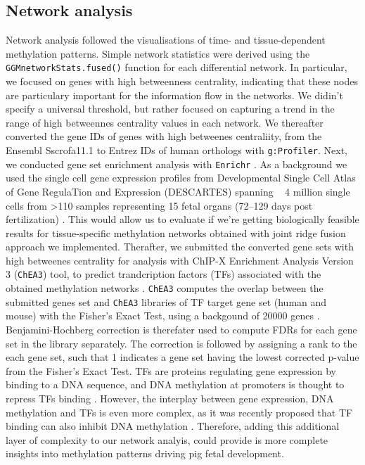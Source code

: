 \documentclass[
	a4paper, %
	10pt, %
	unnumberedsections, %
	twoside, %
]{LTJournalArticle}
\begin{document}
\subsection{\normalsize Network analysis}
Network analysis followed the visualisations of time- and tissue-dependent  
methylation patterns. Simple 
network statistics were derived using the \texttt{GGMnetworkStats.fused()} function 
for each differential network. In particular, we focused on genes with high betweenness centrality, indicating that these nodes
are particulary important for the information flow in the networks. We didin't specify a universal threshold,
but rather focused on capturing a trend in the range of high betweennes centrality values in each network.
We thereafter converted the gene IDs of genes with high betweenes centraliity, from the Ensembl Sscrofa11.1 
to Entrez IDs of human orthologs with \texttt{g:Profiler}.  
Next, we conducted gene set enrichment analysis with \texttt{Enrichr} \autocite{chen2013a, kuleshov2016a, xie2021a}.
As a background we used the single cell gene expression profiles from  Developmental Single Cell Atlas 
of Gene RegulaTion and Expression
(DESCARTES) spanning ~ 4 million single cells from >110 samples representing 15 fetal organs 
(72–129 days post fertilization) \autocite{cao2020a}.
This would allow us to evaluate if we're getting biologically feasible results for tissue-specific methylation networks
obtained with joint ridge fusion approach we implemented.
Therafter, we submitted the converted gene sets with high betweenes 
centrality for analysis with ChIP-X Enrichment Analysis Version 3 (\texttt{ChEA3}) tool, 
to predict trandcription factors (TFs)
associated with the obtained methylation networks \autocite{keenan2019a}. 
\texttt{ChEA3} computes the overlap between the submitted genes set and
\texttt{ChEA3} libraries of TF target gene set (human and mouse) with the Fisher's Exact 
Test, using a backgound of 20000 genes \autocite{keenan2019a}. Benjamini-Hochberg correction
is therefater used to compute FDRs for each gene set in the library separately. The correction is followed by assigning a rank to the
each gene set, such that 1 indicates a gene set having the lowest corrected p-value from the 
Fisher's Exact Test. TFs are proteins regulating
gene expression by binding to a DNA sequence, and DNA methylation at promoters is 
thought to repress TFs binding \autocite{wang2015a, mendoza2022a}. However, the interplay between gene expression, DNA methylation and
TFs is even more complex, as it was recently proposed that TF binding can also inhibit DNA methylation \autocite{h2019a}.
Therefore, adding this additional layer of complexity to our network analyis, could
provide is more complete insights into methylation patterns driving pig fetal development.
\end{document}
